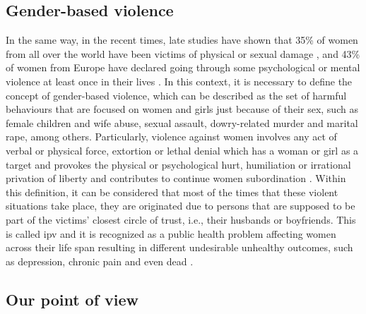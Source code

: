 \subsection{Gender-based violence}

	
	 In the same way, in the recent times, late studies have shown that 35\% of women from all over the world have been victims of physical or sexual damage \cite{WHO2013}, and 43\% of women from Europe have declared going through some psychological or mental violence at least once in their lives \cite{EuropeanUnionAgencyforFundamentalRights2014}. In this context, it is necessary to define the concept of gender-based violence, which can be described as the set of harmful behaviours that are focused on women and girls just because of their sex, such as female children and wife abuse, sexual assault, dowry-related murder and marital rape, among others. Particularly, violence against women involves any act of verbal or physical force, extortion or lethal denial which has a woman or girl as a target and provokes the physical or psychological hurt, humiliation or irrational privation of liberty and contributes to continue women subordination \cite{Heise1999}. Within this definition, it can be considered that most of the times that these violent situations take place, they are originated due to persons that are supposed to be part of the victims' closest circle of trust, i.e., their husbands or boyfriends. This is called \acrfull{ipv} and it is recognized as a public health problem affecting women across their life span resulting in different undesirable unhealthy outcomes, such as depression, chronic pain and even dead \cite{Beyer2015}.
	
\subsection{Our point of view}
\label{subsection:our-point-of-view}

